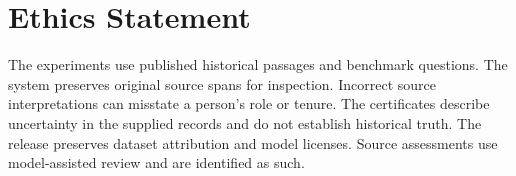 \section*{Ethics Statement}
The experiments use published historical passages and benchmark questions.
The system preserves original source spans for inspection.
Incorrect source interpretations can misstate a person's role or tenure.
The certificates describe uncertainty in the supplied records and do not establish historical truth.
The release preserves dataset attribution and model licenses.
Source assessments use model-assisted review and are identified as such.
